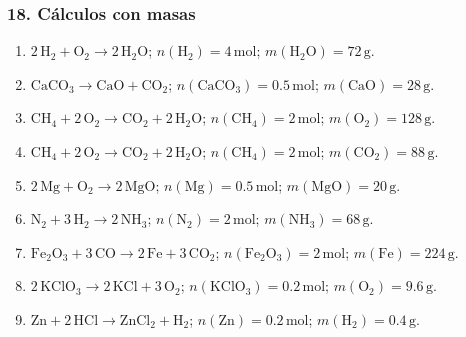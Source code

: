 \subsubsection*{18. Cálculos con masas}
\begin{enumerate}
    \item[a)] $2\,\mathrm{H_2}+\mathrm{O_2}\rightarrow2\,\mathrm{H_2O}$;
    $n(\mathrm{H_2})=4\,\mathrm{mol}$;
    $m(\mathrm{H_2O})=72\,\mathrm{g}$.

    \item[b)] $\mathrm{CaCO_3}\rightarrow\mathrm{CaO}+\mathrm{CO_2}$;
    $n(\mathrm{CaCO_3})=0.5\,\mathrm{mol}$;
    $m(\mathrm{CaO})=28\,\mathrm{g}$.

    \item[c)] $\mathrm{CH_4}+2\,\mathrm{O_2}\rightarrow
    \mathrm{CO_2}+2\,\mathrm{H_2O}$;
    $n(\mathrm{CH_4})=2\,\mathrm{mol}$;
    $m(\mathrm{O_2})=128\,\mathrm{g}$.

    \item[d)] $\mathrm{CH_4}+2\,\mathrm{O_2}\rightarrow
    \mathrm{CO_2}+2\,\mathrm{H_2O}$;
    $n(\mathrm{CH_4})=2\,\mathrm{mol}$;
    $m(\mathrm{CO_2})=88\,\mathrm{g}$.

    \item[e)] $2\,\mathrm{Mg}+\mathrm{O_2}\rightarrow2\,\mathrm{MgO}$;
    $n(\mathrm{Mg})=0.5\,\mathrm{mol}$;
    $m(\mathrm{MgO})=20\,\mathrm{g}$.

    \item[f)] $\mathrm{N_2}+3\,\mathrm{H_2}\rightarrow2\,\mathrm{NH_3}$;
    $n(\mathrm{N_2})=2\,\mathrm{mol}$;
    $m(\mathrm{NH_3})=68\,\mathrm{g}$.

    \item[g)] $\mathrm{Fe_2O_3}+3\,\mathrm{CO}\rightarrow
    2\,\mathrm{Fe}+3\,\mathrm{CO_2}$;
    $n(\mathrm{Fe_2O_3})=2\,\mathrm{mol}$;
    $m(\mathrm{Fe})=224\,\mathrm{g}$.

    \item[h)] $2\,\mathrm{KClO_3}\rightarrow2\,\mathrm{KCl}+3\,\mathrm{O_2}$;
    $n(\mathrm{KClO_3})=0.2\,\mathrm{mol}$;
    $m(\mathrm{O_2})=9.6\,\mathrm{g}$.

    \item[i)] $\mathrm{Zn}+2\,\mathrm{HCl}\rightarrow
    \mathrm{ZnCl_2}+\mathrm{H_2}$;
    $n(\mathrm{Zn})=0.2\,\mathrm{mol}$;
    $m(\mathrm{H_2})=0.4\,\mathrm{g}$.
\end{enumerate}

